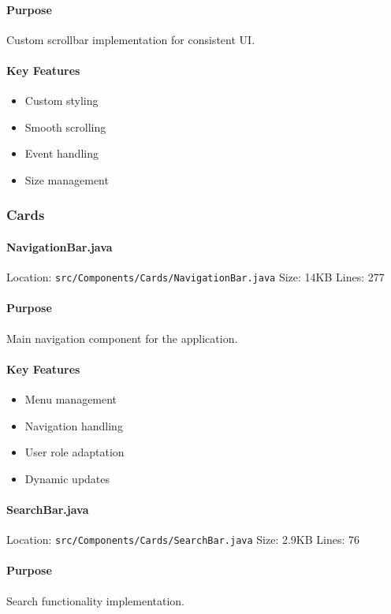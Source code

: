 \documentclass[12pt,a4paper]{article}
\begin{document}
\paragraph{Purpose}
Custom scrollbar implementation for consistent UI.

\paragraph{Key Features}
\begin{itemize}
    \item Custom styling
    \item Smooth scrolling
    \item Event handling
    \item Size management
\end{itemize}

\subsubsection{Cards}
\paragraph{NavigationBar.java}
Location: \texttt{src/Components/Cards/NavigationBar.java}
Size: 14KB
Lines: 277

\paragraph{Purpose}
Main navigation component for the application.

\paragraph{Key Features}
\begin{itemize}
    \item Menu management
    \item Navigation handling
    \item User role adaptation
    \item Dynamic updates
\end{itemize}

\paragraph{SearchBar.java}
Location: \texttt{src/Components/Cards/SearchBar.java}
Size: 2.9KB
Lines: 76

\paragraph{Purpose}
Search functionality implementation.
\end{document}

